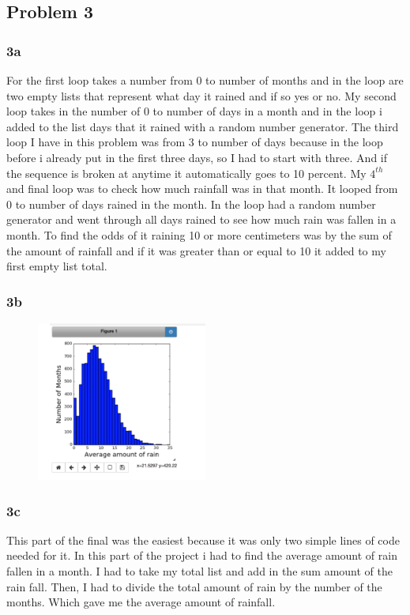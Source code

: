\documentclass[twocolumn]{revtex4}
\begin{document}
\subsection{Problem 3}

\subsubsection{3a}
For the first loop takes a number from 0 to number of months and in the loop are two empty lists that represent what day it rained and if so yes or no.  My second loop takes in the number of 0 to number of days in a month and in the loop i added to the list days that it rained with a random number generator. The third loop I have in this problem was from 3 to number of days because in the loop before i already put in the first three days, so I had to start with three.  And if the sequence is broken at anytime it automatically goes to 10 percent.  My $4^{th}$ and final loop was to check how much rainfall was in that month.  It looped from 0 to number of days rained in the month.  In the loop had a random number generator and went through all days rained to see how much rain was fallen in a month.  To find the odds of it raining 10 or more centimeters was by the sum of the amount of rainfall and if it was greater than or equal to 10 it added to my first empty list total.  


\subsubsection{3b}

\FloatBarrier
\begin{figure}[h]

\centering
	\includegraphics[width=0.5\textwidth]{Histogram}

\end{figure}	
\FloatBarrier


\subsubsection{3c}
This part of the final was the easiest because it was only two simple lines of code needed for it.  In this part of the project i had to find the average amount of rain fallen in a month.  I had to take my total list and add in the sum amount of the rain fall.  Then, I had to divide the total amount of rain by the number of the months.  Which gave me the average amount of rainfall.
\end{document}
